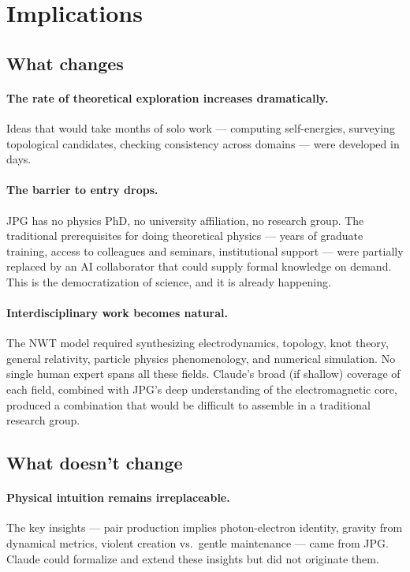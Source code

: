 \documentclass[11pt,a4paper]{article}
\begin{document}
\section{Implications}
\label{sec:implications}

\subsection{What changes}

\paragraph{The rate of theoretical exploration increases dramatically.}
Ideas that would take months of solo work --- computing self-energies, surveying topological candidates, checking consistency across domains --- were developed in days.

\paragraph{The barrier to entry drops.}
JPG has no physics PhD, no university affiliation, no research group. The traditional prerequisites for doing theoretical physics --- years of graduate training, access to colleagues and seminars, institutional support --- were partially replaced by an AI collaborator that could supply formal knowledge on demand. This is the democratization of science, and it is already happening.

\paragraph{Interdisciplinary work becomes natural.}
The NWT model required synthesizing electrodynamics, topology, knot theory, general relativity, particle physics phenomenology, and numerical simulation. No single human expert spans all these fields. Claude's broad (if shallow) coverage of each field, combined with JPG's deep understanding of the electromagnetic core, produced a combination that would be difficult to assemble in a traditional research group.

\subsection{What doesn't change}

\paragraph{Physical intuition remains irreplaceable.}
The key insights --- pair production implies photon-electron identity, gravity from dynamical metrics, violent creation vs.\ gentle maintenance --- came from JPG. Claude could formalize and extend these insights but did not originate them.
\end{document}
